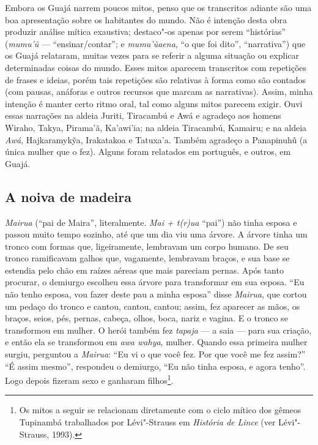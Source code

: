 Embora os Guajá narrem poucos mitos, penso que os transcritos adiante
são uma boa apresentação sobre os habitantes do mundo. Não é intenção
desta obra produzir análise mítica exaustiva; destaco"-os apenas por
serem ``histórias'' (\emph{mumu'ũ} --- ``ensinar/contar''; e
\emph{mumu'ũaena}, ``o que foi dito'', ``narrativa'') que os Guajá
relataram, muitas vezes para se referir a alguma situação ou explicar
determinadas coisas do mundo. Esses mitos aparecem transcritos com
repetições de frases e ideias, porém tais repetições são relativas à
forma como são contados (com pausas, anáforas e outros recursos que
marcam as narrativas). Assim, minha intenção é manter certo ritmo oral,
tal como alguns mitos parecem exigir. Ouvi essas narrações na aldeia
Juriti, Tiracambú e Awá e agradeço aos homens Wiraho, Takya, Pirama'ã,
Ka'awi'ia; na aldeia Tiracambú, Kamairu; e na aldeia \emph{Awá},
Hajkaramykỹa, Irakatakoa e Tatuxa'a. Também agradeço a Panapinuhũ (a
única mulher que o fez). Alguns foram relatados em português, e outros,
em Guajá.

\subsection{A noiva de madeira}

\forceindent\emph{Mairua} (``pai de Maira'', literalmente. \emph{Mai + t(r)ua} ``pai'')
não tinha esposa e passou muito tempo sozinho, até que um dia viu uma
árvore. A árvore tinha um tronco com formas que, ligeiramente, lembravam
um corpo humano. De seu tronco ramificavam galhos que, vagamente,
lembravam braços, e sua base se estendia pelo chão em raízes aéreas que
mais pareciam pernas. Após tanto procurar, o demiurgo escolheu essa
árvore para transformar em sua esposa. ``Eu não tenho esposa, vou fazer
deste pau a minha esposa'' disse \emph{Mairua}, que cortou um pedaço do
tronco e cantou, cantou, cantou; assim, fez aparecer as mãos, os braços,
seios, pés, pernas, cabeça, olhos, boca, nariz e vagina. E o tronco se
transformou em mulher. O herói também fez \emph{tapaja} --- a saia --- para
sua criação, e então ela se transformou em \emph{awa wahya}, mulher.
Quando essa primeira mulher surgiu, perguntou a \emph{Mairua}: ``Eu vi o
que você fez. Por que você me fez assim?'' ``É assim mesmo'', respondeu o
demiurgo, ``Eu não tinha esposa, e agora tenho''. Logo depois fizeram sexo
e ganharam filhos\footnote{Os mitos a seguir se relacionam diretamente
  com o ciclo mítico dos gêmeos Tupinambá trabalhados por Lévi"-Strauss
  em \emph{História de Lince} (ver Lévi"-Strauss, 1993).}.


